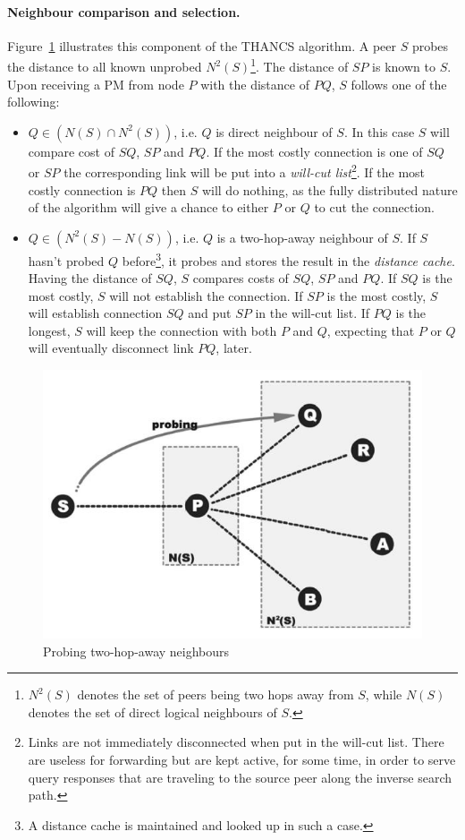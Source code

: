 \documentclass[a4paper,10pt]{article}
\begin{document}
\paragraph*{Neighbour comparison and selection.}
Figure~\ref{figure:thancs} illustrates this component of the THANCS algorithm. A peer $S$ probes the distance to all known unprobed $N^2(S)$\footnote{$N^2(S)$ denotes the set of peers being two hops away from $S$, while $N(S)$ denotes the set of direct logical neighbours of $S$.}. The distance of $SP$ is known to $S$. Upon receiving a PM from node $P$ with the distance of $PQ$, $S$ follows one of the following:
\begin{itemize}
  \item $Q \in \left( N(S) \cap N^2(S) \right)$, i.e. $Q$ is direct neighbour of $S$. In this case $S$ will compare cost of $SQ$, $SP$ and $PQ$. If the most costly connection is one of $SQ$ or $SP$ the corresponding link will be put into a \emph{will-cut list}\footnote{Links are not immediately disconnected when put in the will-cut list. There are useless for forwarding but are kept active, for some time, in order to serve query responses that are traveling to the source peer along the inverse search path.}. If the most costly connection is $PQ$ then $S$ will do nothing, as the fully distributed nature of the algorithm will give a chance to either $P$ or $Q$ to cut the connection.
  \item $Q \in \left( N^2(S) - N(S) \right)$, i.e. $Q$ is a two-hop-away neighbour of $S$. If $S$ hasn't probed $Q$ before\footnote{A distance cache is maintained and looked up in such a case.}, it probes and stores the result in the \emph{distance cache}. Having the distance of $SQ$, $S$ compares costs of $SQ$, $SP$ and $PQ$. If $SQ$ is the most costly, $S$ will not establish the connection. If $SP$ is the most costly, $S$ will establish connection $SQ$ and put $SP$ in the will-cut list. If $PQ$ is the longest, $S$ will keep  the connection with both $P$ and $Q$, expecting that $P$ or $Q$ will eventually disconnect link $PQ$, later.
\end{itemize}

\begin{figure}
\centering
  \includegraphics[scale=0.4]{img/thancs.jpeg}
\caption{Probing two-hop-away neighbours}
\label{figure:thancs}
\end{figure}
\end{document}
